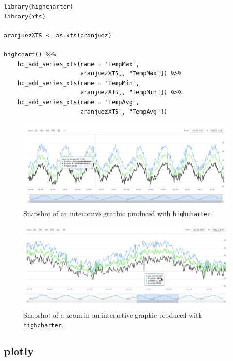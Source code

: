 \lstset{language=r,label= ,caption= ,captionpos=b,numbers=none}
\begin{lstlisting}
library(highcharter)
library(xts)

aranjuezXTS <- as.xts(aranjuez)

highchart() %>%
    hc_add_series_xts(name = 'TempMax',
                      aranjuezXTS[, "TempMax"]) %>%
    hc_add_series_xts(name = 'TempMin',
                      aranjuezXTS[, "TempMin"]) %>%
    hc_add_series_xts(name = 'TempAvg',
                      aranjuezXTS[, "TempAvg"])

\end{lstlisting}

\begin{figure}[htbp]
\centering
\includegraphics[width=.9\linewidth]{figs/highcharter_aranjuez.png}
\caption{Snapshot of an interactive graphic produced with \texttt{highcharter}. \label{fig:highcharter}}
\end{figure}

\begin{figure}[htbp]
\centering
\includegraphics[width=.9\linewidth]{figs/highcharter_aranjuez_zoom.png}
\caption{Snapshot of a zoom in an interactive graphic produced with \texttt{highcharter}. \label{fig:highcharter_zoom}}
\end{figure}



\subsection{plotly \label{sec:plotly_horizontal}}
\label{sec:org3f94bf4}

